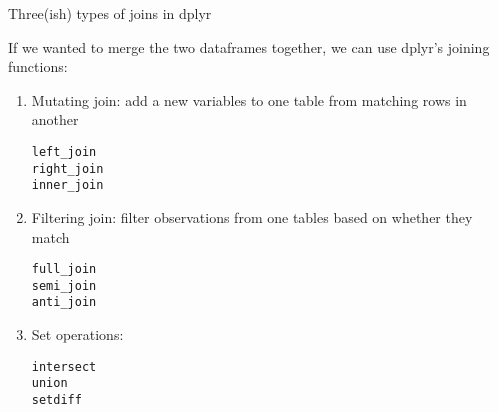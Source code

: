 \documentclass[ignorenonframetext,]{beamer}
\begin{document}
\begin{frame}[fragile]{Three(ish) types of joins in dplyr}

If we wanted to merge the two dataframes together, we can use dplyr's
joining functions:

\begin{enumerate}
\def\labelenumi{\arabic{enumi}.}
\item
  Mutating join: add a new variables to one table from matching rows in
  another

\begin{verbatim}
left_join
right_join
inner_join
\end{verbatim}
\item
  Filtering join: filter observations from one tables based on whether
  they match

\begin{verbatim}
full_join
semi_join
anti_join
\end{verbatim}
\item
  Set operations:

\begin{verbatim}
intersect
union
setdiff
\end{verbatim}
\end{enumerate}

\end{frame}
\end{document}
